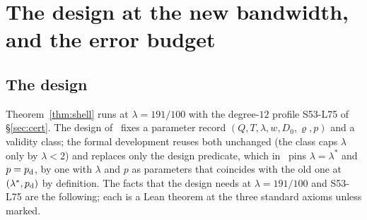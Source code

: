 \section{The design at the new bandwidth, and the error budget}\label{sec:design}

\subsection{The design}
Theorem~\ref{thm:shell} runs at $\lambda=191/100$ with the degree-$12$ profile S53-L75 of \S\ref{sec:cert}. The design of~\cite{DSouza} fixes a parameter record $(Q,T,\lambda,w,D_0,\varrho,p)$ and a validity class; the formal
development reuses both unchanged (the class caps $\lambda$ only by $\lambda<2$) and replaces only the design predicate, which in~\cite{DSouza} pins
$\lambda=\lambda^*$ and $p=p_{\rm d}$, by one with $\lambda$ and $p$ as parameters that coincides with the old one at $(\lambda^*,p_{\rm d})$ by definition.
The facts that the design needs at $\lambda=191/100$ and S53-L75 are the following; each is a Lean theorem at the three standard axioms
unless marked.
